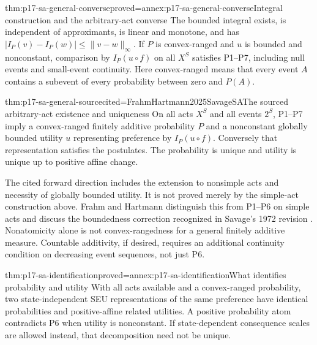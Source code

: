 \begin{hbtheorem}{thm:p17-sa-general-converse}{proved=annex:p17-sa-general-converse}{Integral construction and the arbitrary-act converse}
The bounded integral exists, is independent of approximants,
is linear and monotone, and has
\(|I_P(v)-I_P(w)|\leq\lVert v-w\rVert_\infty\).
If \(P\) is convex-ranged and \(u\) is bounded and nonconstant,
comparison by \(I_P(u\circ f)\) on all \(X^S\) satisfies
P1--P7, including null events and small-event continuity.
Here convex-ranged means that every event \(A\) contains
a subevent of every probability between zero and \(P(A)\).
\end{hbtheorem}

\begin{hbtheorem}{thm:p17-sa-general-source}{cited=FrahmHartmann2025SavageSA}{The sourced arbitrary-act existence and uniqueness}
On all acts \(X^S\) and all events \(2^S\), P1--P7 imply
a convex-ranged finitely additive probability \(P\) and
a nonconstant globally bounded utility \(u\) representing
preference by \(I_P(u\circ f)\).
Conversely that representation satisfies the postulates.
The probability is unique and utility is unique up to
positive affine change.
\end{hbtheorem}

The cited forward direction includes the extension to nonsimple
acts and necessity of globally bounded utility. It is not
proved merely by the simple-act construction above.
Frahm and Hartmann distinguish this from P1--P6 on simple
acts and discuss the boundedness correction recognized in
Savage's 1972 revision
\cite[Sec.\ 2]{FrahmHartmann2025SavageSA}.
Nonatomicity alone is not convex-rangedness for a general
finitely additive measure. Countable additivity, if desired,
requires an additional continuity condition on decreasing
event sequences, not just P6.

\begin{hbtheorem}{thm:p17-sa-identification}{proved=annex:p17-sa-identification}{What identifies probability and utility}
With all acts available and a convex-ranged probability,
two state-independent SEU representations of the same
preference have identical probabilities and positive-affine
related utilities. A positive probability atom contradicts
P6 when utility is nonconstant.
If state-dependent consequence scales are allowed instead,
that decomposition need not be unique.
\end{hbtheorem}

